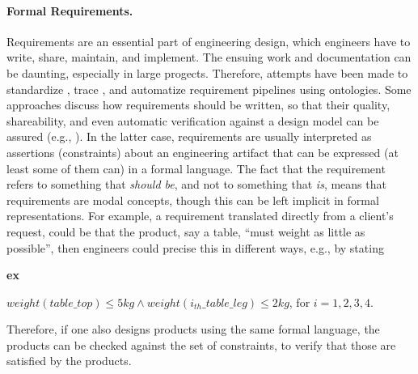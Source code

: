\documentclass[sw]{iosart2x}
\newcommand{\bflist}{\begin{list}{}{\setlength{\topsep}{2mm}\setlength{\partopsep}{0mm}\setlength{\parsep}{0mm}\setlength{\leftmargin}{9mm}\setlength{\labelwidth}{8mm}}}
\newcommand{\eflist}{\end{list}}
\newcommand{\ExLabel}{\textrm{ex}}
\newcommand{\myex}[1]{\refstepcounter{cntex}\begin{small}{\bf \ExLabel\thecntex\label{ex:#1}}\end{small}}
\newcounter{cntex}
\newcommand{\qquotes}[1]{``#1''}
\begin{document}
\paragraph{Formal Requirements.}
Requirements are an essential part of engineering design, which engineers have to write, share, maintain, and implement. 
The ensuing work and documentation can be daunting, especially in large progects. Therefore, attempts have been made to standardize \cite{alrumaihDomainOntologyRequirements2020}, trace \cite{murtazinaOntologybasedApproachSupport2019}, and automatize \cite{holterScopeDetectionTextual2021} requirement pipelines using ontologies. 
Some approaches discuss how requirements should be written, so that their quality, shareability, and even automatic verification against a design model can be assured (e.g., \cite{jinxinlinRequirementOntologyEngineering1996, chenOntologybasedRequirementVerification2020}).
In the latter case, requirements are usually interpreted as assertions (constraints) about an engineering artifact that can be expressed (at least some of them can) in a formal language. 
The fact that the requirement refers to something that \textit{should be}, and not to something that \textit{is}, means that requirements are modal concepts, though this can be left implicit in formal representations.  
For example, a requirement translated directly from a client's request, could be that the product, say a table, \qquotes{must weight as little as possible}, then engineers could precise this in different ways, e.g., by stating 
\bflist
  \item[\myex{req1}] $ weight(table\_top) \leq 5kg \land weight(i_{th}\_table\_leg) \leq 2kg$, for $i = 1,2,3,4$. 
\eflist
Therefore, if one also designs products using the same formal language, the products can be checked against the set of constraints, to verify that those are satisfied by the products.
\end{document}
